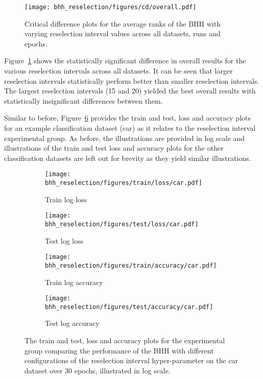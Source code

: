 \begin{figure}[htb]
	\centering
	\texttt{[image: bhh\_reselection/figures/cd/overall.pdf]}
	\caption{Critical difference plots for the average ranks of the \acs{BHH} with varying reselection interval values across all datasets, runs and epochs.}
	\label{fig:results:reselection:descriptive:cd}
\end{figure}

Figure~\ref{fig:results:reselection:descriptive:cd} shows the statistically significant difference in overall results for the various reselection intervals across all datasets. It can be seen that larger reselection intervals statistically perform better than smaller reselection intervals. The largest reselection intervals (15 and 20) yielded the best overall results with statistically insignificant differences between them.

Similar to before, Figure~\ref{fig:results:reselection:figures:car} provides the train and test, loss and accuracy plots for an example classification dataset (car) as it relates to the reselection interval experimental group. As before, the illustrations are provided in log scale and illustrations of the train and test loss and accuracy plots for the other classification datasets are left out for brevity as they yield similar illustrations.

\begin{figure}[htbp]
	\begin{subfigure}{0.5\textwidth}
		\centering
		\texttt{[image: bhh\_reselection/figures/train/loss/car.pdf]}
		\caption{Train log loss}
		\label{fig:results:reselection:figures:loss:train:car}
	\end{subfigure}
	\begin{subfigure}{0.5\textwidth}
		\centering
		\texttt{[image: bhh\_reselection/figures/test/loss/car.pdf]}
		\caption{Test log loss}
		\label{fig:results:reselection:figures:loss:test:car}
	\end{subfigure}
	\par\bigskip
	\begin{subfigure}{0.5\textwidth}
		\centering
		\texttt{[image: bhh\_reselection/figures/train/accuracy/car.pdf]}
		\caption{Train log accuracy}
		\label{fig:results:reselection:figures:accuracy:train:car}
	\end{subfigure}
	\begin{subfigure}{0.5\textwidth}
		\centering
		\texttt{[image: bhh\_reselection/figures/test/accuracy/car.pdf]}
		\caption{Test log accuracy}
		\label{fig:results:reselection:figures:accuracy:test:car}
	\end{subfigure}
	\par\bigskip
	\caption{The train and test, loss and accuracy plots for the experimental group comparing the performance of the \acs{BHH} with different configurations of the reselection interval hyper-parameter on the car dataset over 30 epochs, illustrated in log scale.}
	\label{fig:results:reselection:figures:car}
\end{figure}

